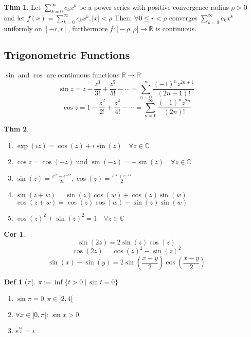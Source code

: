 \documentclass[a4paper, 10pt]{article}
\newtheorem*{corollary}{Cor}
\theoremstyle{definition}
\newtheorem*{theorem}{Thm}
\newtheorem*{definition}{Def}
\theoremstyle{named}
\newcommand{\R}{\mathbb{R}}
\newcommand{\C}{\mathbb{C}}
\begin{document}
\begin{theorem}
    Let $\sum_{k=0}^\infty c_kx^k$ be a power series with positive convergence radius $\rho > 0$ and let $f(x) = \sum_{k=0}^\infty c_kx^k, |x| < \rho$ Then: $\forall 0 \leq r < \rho$ converges $\sum_{k=0}^\infty c_kx^k$ uniformly on $[-r,r]$, furthermore  $f: ]-\rho, \rho[ \to \mathbb{R}$ is continuous.
\end{theorem}

\subsection{Trigonometric Functions}
$\sin$ and $\cos$ are continuous functions $\R \to \R$
$$\sin z = z - \frac{z^3}{3!} + \frac{z^5}{5!} - \cdots = \sum_{n = 0}^\infty \frac{(-1)^n z^{2n + 1}}{(2n + 1)!}$$
$$\cos z = 1 - \frac{z^2}{2!} + \frac{z^4}{4!} - \cdots = \sum_{n = 0}^\infty \frac{(-1)^n z^{2n}}{(2n)!}$$

\begin{theorem}
    \begin{enumerate}
        \item $\exp(iz) = \cos(z) +i\sin(z) \quad \forall z \in \C$
        \item $\cos z = \cos(-z) \text{ und } \sin(-z) = - \sin(z) \quad \forall z \in \C$
        \item $\sin(z) = \frac{e^{iz}-e^{-iz}}{2i}, \cos(z) = \frac{e^{iz}+e^{-iz}}{2}$
        \item $\sin(z+w) = \sin(z)\cos(w) + \cos(z)\sin(w)$ \\
            $\cos(z+w) = \cos(z)\cos(w) - \sin(z)\sin(w)$
        \item $\cos(z)^2+\sin(z)^2 = 1 \quad \forall z \in \mathbb{C}$
    \end{enumerate}
\end{theorem}

\begin{corollary}
    $$\sin(2z) = 2 \sin(z)\cos(z)$$
    $$\cos(2z) = \cos(z)^2 - \sin(z)^2$$
    $$\sin(x) - \sin(y) = 2 \sin\left(\frac{x + y}{2}\right)\cos\left(\frac{x - y}{2}\right)$$
\end{corollary}

\begin{definition}[$\pi$]
    $\pi := \inf \{ t > 0 \ | \ \sin t = 0\}$
    \begin{enumerate}[label=(\roman*)]
        \item $\sin \pi = 0, \pi \in ]2, 4[$
        \item $\forall x \in ]0, \pi[$: $\sin x > 0$
        \item $e^{\frac{i \pi}{2}} = i$
    \end{enumerate}
\end{definition}
\end{document}
